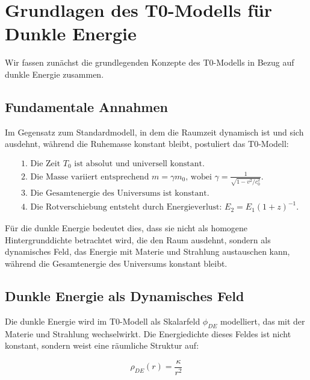 \documentclass[a4paper,12pt]{article}
\begin{document}
\section{Grundlagen des T0-Modells für Dunkle Energie}

Wir fassen zunächst die grundlegenden Konzepte des T0-Modells in Bezug auf dunkle Energie zusammen.

\subsection{Fundamentale Annahmen}

Im Gegensatz zum Standardmodell, in dem die Raumzeit dynamisch ist und sich ausdehnt, während die Ruhemasse konstant bleibt, postuliert das T0-Modell:

\begin{tcolorbox}[colback=blue!5!white,colframe=blue!75!black,title=Grundannahmen des T0-Modells]
	\begin{align}
		&\text{1. Die Zeit $T_0$ ist absolut und universell konstant.} \\
		&\text{2. Die Masse variiert entsprechend $m = \gamma m_0$, wobei $\gamma = \frac{1}{\sqrt{1-v^2/c_0^2}}$.} \\
		&\text{3. Die Gesamtenergie des Universums ist konstant.} \\
		&\text{4. Die Rotverschiebung entsteht durch Energieverlust: $E_2 = E_1(1+z)^{-1}$.}
	\end{align}
\end{tcolorbox}

Für die dunkle Energie bedeutet dies, dass sie nicht als homogene Hintergrunddichte betrachtet wird, die den Raum ausdehnt, sondern als dynamisches Feld, das Energie mit Materie und Strahlung austauschen kann, während die Gesamtenergie des Universums konstant bleibt.

\subsection{Dunkle Energie als Dynamisches Feld}

Die dunkle Energie wird im T0-Modell als Skalarfeld $\phi_{DE}$ modelliert, das mit der Materie und Strahlung wechselwirkt. Die Energiedichte dieses Feldes ist nicht konstant, sondern weist eine räumliche Struktur auf:

\begin{equation}
	\rho_{DE}(r) = \frac{\kappa}{r^2}
\end{equation}
\end{document}
